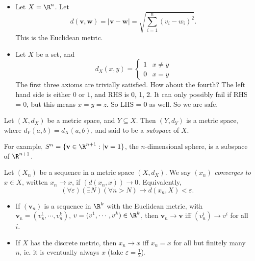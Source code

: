 \documentclass[a4paper]{article}
\begin{document}
\begin{eg}\leavevmode
  \begin{itemize}
    \item Let $X = \R^n$. Let 
      \[
        d(\mathbf{v}, \mathbf{w}) = |\mathbf{v} - \mathbf{w}| = \sqrt{\sum_{i = 1}^n (v_i - w_i)^2}.
      \]
      This is the Euclidean metric.
    \item Let $X$ be a set, and
      \[
        d_X(x, y) =
        \begin{cases}
          1 & x \not= y\\
          0 & x = y
        \end{cases}
      \]
      The first three axioms are trivially satisfied. How about the fourth? The left hand side is either $0$ or $1$, and RHS is 0, 1, 2. It can only possibly fail if RHS = 0, but this means $x = y = z$. So LHS = 0 as well. So we are safe.
  \end{itemize}
\end{eg}
\begin{defi}
  Let $(X, d_X)$ be a metric space, and $Y\subseteq X$. Then $(Y, d_Y)$ is a metric space, where $d_Y(a, b) = d_X(a, b)$, and said to be a \emph{subspace} of $X$. 
\end{defi}

\begin{eg}
  For example, $S^n = \{\mathbf{v}\in \R^{n + 1}: |\mathbf{v} = 1\}$, the $n$-dimensional sphere, is a subspace of $\R^{n + 1}$.
\end{eg}

\begin{defi}
  Let $(X_n)$ be a sequence in a metric space $(X, d_X)$. We say $(x_n)$ \emph{converges to} $x\in X$, written $x_n \to x$, if $(d(x_n, x)) \to 0$. Equivalently, 
  \[
    (\forall \varepsilon)(\exists N)(\forall n > N) \to d(x_n, X) < \varepsilon.
  \]
\end{defi}
\begin{eg}\leavevmode
  \begin{itemize}
    \item If $(\mathbf{v}_n)$ is a sequence in $\R^k$ with the Euclidean metric, with $\mathbf{v}_n = (v_n^1, \cdots, v_n^k)$, $v = (v^1, \cdots, v^k)\in \R^k$, then $\mathbf{v}_n \to \mathbf{v}$ iff $(v_n^i) \to v^i$ for all $i$.

    \item If $X$ has the discrete metric, then $x_n \to x$ iff $x_n = x$ for all but finitely many $n$, ie. it is eventually always $x$ (take $\varepsilon = \frac{1}{2}$).
  \end{itemize}
\end{eg}
\end{document}
